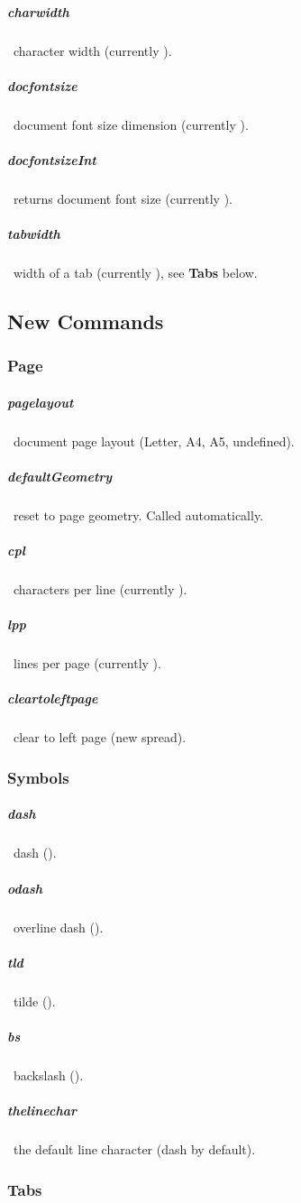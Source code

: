 \documentclass[english,12pt,openany,letterpaper]{book}
\begin{document}
\subparagraph{\bs charwidth} \dash\ character width (currently \the\charwidth).

\subparagraph{\bs docfontsize} \dash\ document font size dimension (currently \the\docfontsize).

\subparagraph{\bs docfontsizeInt} \dash\ returns document font size (currently \docfontsizeInt).

\subparagraph{\bs tabwidth} \dash\ width of a tab (currently \the\tabwidth), see \textbf{Tabs} below.

\skipline

\subsection{New Commands}

\skipline

\subsubsection{Page}

\subparagraph{\bs pagelayout} \dash\ document page layout (Letter, A4, A5, undefined).
\subparagraph{\bs defaultGeometry} \dash\ reset to page geometry. Called automatically.
\subparagraph{\bs cpl} \dash\ characters per line (currently \cpl).

\subparagraph{\bs lpp} \dash\ lines per page (currently \lpp).

\subparagraph{\bs cleartoleftpage} \dash\ clear to left page (new spread).

\skipline

\subsubsection{Symbols}

\subparagraph{\bs dash} \dash\ dash (\dash).

\subparagraph{\bs odash} \dash\ overline dash (\odash).

\subparagraph{\bs tld} \dash\ tilde (\tld).

\subparagraph{\bs bs} \dash\ backslash (\bs).

\subparagraph{\bs thelinechar} \dash\ the default line character (\bs dash by default).

\skipline

\subsubsection{Tabs}
\end{document}
